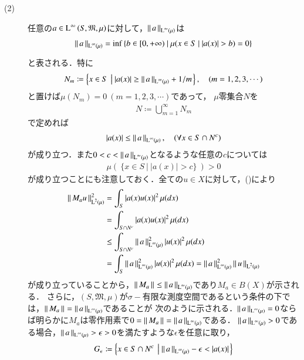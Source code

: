 \begin{prf}
\begin{description}
	\item[(2)] 任意の$a \in \operatorname{L}^{\infty} \left(S, \mathfrak{M}, \mu\right)$に対して，$\left\|\, a\, \right\|_{\operatorname{L}^{\infty} \left(\mu\right)}$は
		\begin{align}
			\left\|\, a\, \right\|_{\operatorname{L}^{\infty} \left(\mu\right)} = \operatorname*{inf}_{} \left\{b \in [0, +\infty)\ |\ \mu(x \in S\ |\ |a(x)| > b) = 0 \right\}
		\end{align}
		と表される．特に
		\begin{align}
			N_m \coloneqq \left\{x \in S\ \left|\ |a(x)| \geq \left\|\, a\, \right\|_{\operatorname{L}^{\infty} \left(\mu\right)} + 1/m \right.\right\}, \quad(m = 1,2,3,\cdots)
		\end{align}
		と置けば$\mu(N_m)=0\ (m=1,2,3,\cdots)$であって，
		$\mu$零集合$N$を
		\begin{align}
			N \coloneqq \bigcup_{m=1}^{\infty} N_m
		\end{align}
		で定めれば
		\begin{align}
			|a(x)| \leq \left\|\, a\, \right\|_{\operatorname{L}^{\infty} \left(\mu\right)}, \quad (\forall x \in S \cap N^c) \label{eq:func_analy_Q9}
		\end{align}
		が成り立つ．また$0 < c < \left\|\, a\, \right\|_{\operatorname{L}^{\infty} \left(\mu\right)}$となるような任意の$c$については
		\begin{align}
			\mu(\ \{x \in S\ |\ |a(x)| > c\}\ ) > 0 \label{eq:func_analy_Linfty}
		\end{align}
		が成り立つことにも注意しておく．全ての$u \in X$に対して，()により
		\begin{align}
			\left\|\, M_a u\, \right\|_{\operatorname{L}^{2} \left(\mu\right)}^2 
			&= \int_{S} |a(x)u(x)|^2\, \mu(dx) \\
			&= \int_{S \cap N^c} |a(x)u(x)|^2\, \mu(dx) \\
			&\leq \int_{S \cap N^c} \left\|\, a\, \right\|_{\operatorname{L}^{\infty} \left(\mu\right)}^2|u(x)|^2\, \mu(dx) \\
			&= \int_{S} \left\|\, a\, \right\|_{\operatorname{L}^{\infty} \left(\mu\right)}^2|u(x)|^2\, \mu(dx)
			= \left\|\, a\, \right\|_{\operatorname{L}^{\infty} \left(\mu\right)}^2 \left\|\, u\, \right\|_{\operatorname{L}^{2} \left(\mu\right)}
		\end{align}
		が成り立っていることから，$\left\|\, M_a\, \right\|_{} \leq \left\|\, a\, \right\|_{\operatorname{L}^{\infty} \left(\mu\right)}$であり$M_a \in B(X)$が示される．
		さらに，$(S, \mathfrak{M}, \mu)$が$\sigma-$有限な測度空間であるという条件の下では，$\left\|\, M_a\, \right\|_{} = \left\|\, a\, \right\|_{\operatorname{L}^{\infty} \left(\mu\right)}$であることが
		次のように示される．$\left\|\, a\, \right\|_{\operatorname{L}^{\infty} \left(\mu\right)} = 0$ならば明らかに$M_a$は零作用素で$0 = \left\|\, M_a\, \right\|_{} = \left\|\, a\, \right\|_{\operatorname{L}^{\infty} \left(\mu\right)}$である．
		$\left\|\, a\, \right\|_{\operatorname{L}^{\infty} \left(\mu\right)} > 0$である場合，$\left\|\, a\, \right\|_{\operatorname{L}^{\infty} \left(\mu\right)} > \epsilon > 0$を満たすような$\epsilon$を任意に取り，
		\begin{align}
			G_\epsilon \coloneqq \left\{ x \in S \cap N^c\ \left|\ \Norm{a}{\Lp{\infty}{\mu}} - \epsilon < |a(x)| \right.\right\}

\end{align}
\end{description}
\end{prf}
